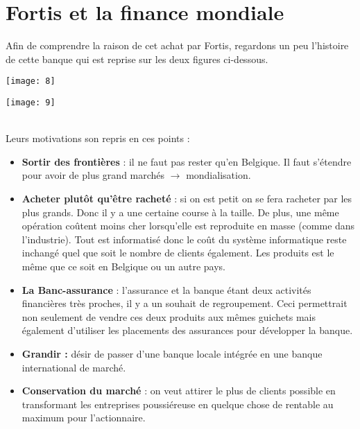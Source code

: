 \section{Fortis et la finance mondiale}
Afin de comprendre la raison de cet achat par Fortis, regardons un peu l'histoire de cette banque qui est reprise sur les deux figures ci-dessous.\\
\begin{minipage}{0.55\textwidth}
	\begin{flushleft}
		\texttt{[image: 8]}
	\end{flushleft}
\end{minipage} 
\begin{minipage}{0.5\textwidth}
	\begin{flushright}
		\texttt{[image: 9]}
	\end{flushright}
\end{minipage} \\

Leurs motivations son repris en ces points : 
\begin{itemize}
	\item \textbf{Sortir des frontières} : il ne faut pas rester qu'en Belgique. Il faut s'étendre pour avoir de plus grand marchés $\rightarrow$ mondialisation.
	      
	\item \textbf{Acheter plutôt qu'être racheté} : si on est petit on se fera racheter par les plus grands. Donc il y a une certaine course à la taille. De plus, une même opération coûtent moins cher lorsqu'elle est reproduite en masse (comme dans l'industrie). Tout est informatisé donc le coût du système informatique reste inchangé quel que soit le nombre de clients également. Les produits est le même que ce soit en Belgique ou un autre pays. 
	      
	\item \textbf{La Banc-assurance} : l'assurance et la banque étant deux activités financières très proches, il y a un souhait de regroupement. Ceci permettrait non seulement de vendre ces deux produits aux mêmes guichets mais également d'utiliser les placements des assurances pour développer la banque.
	      
	\item \textbf{Grandir :} désir de passer d'une banque locale intégrée en une  banque international de marché. 
	      
	\item \textbf{Conservation du marché} : on veut attirer le plus de clients possible en transformant les entreprises poussiéreuse en quelque chose de rentable au maximum pour l'actionnaire.
\end{itemize}

